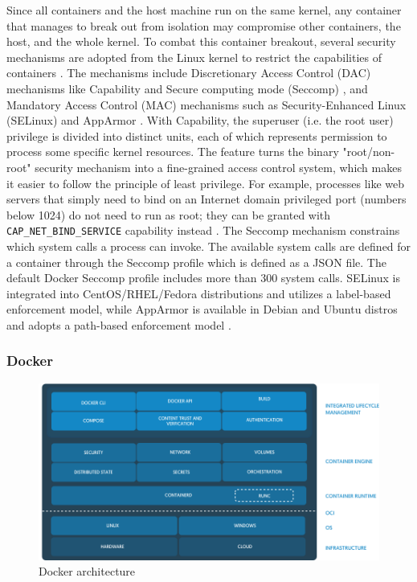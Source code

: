 \documentclass[english, 12pt, a4paper, sci, utf8, a-2b, online]{aaltothesis}
\begin{document}
Since all containers and the host machine run on the same kernel, any container that manages to break out from isolation may compromise other containers, the host, and the whole kernel.
To combat this container breakout, several security mechanisms are adopted from the Linux kernel to restrict the capabilities of containers \cite{lin2018measurement}.
The mechanisms include Discretionary Access Control (DAC) mechanisms like Capability \cite{manpages-capabilities} and Secure computing mode (Seccomp) \cite{manpages-seccomp}, and Mandatory Access Control (MAC) mechanisms such as Security-Enhanced Linux (SELinux) and AppArmor \cite{apparmor}.
With Capability, the superuser (i.e. the root user) privilege is divided into distinct units, each of which represents permission to process some specific kernel resources.
The feature turns the binary "root/non-root" security mechanism into a fine-grained access control system, which makes it easier to follow the principle of least privilege.
For example, processes like web servers that simply need to bind on an Internet domain privileged port (numbers below 1024) do not need to run as root; they can be granted with \lstinline{CAP_NET_BIND_SERVICE} capability instead \cite{docker-security}.
The Seccomp mechanism constrains which system calls a process can invoke.
The available system calls are defined for a container through the Seccomp profile which is defined as a JSON file.
The default Docker Seccomp profile \cite{docker-default-seccomp} includes more than 300 system calls.
SELinux is integrated into CentOS/RHEL/Fedora distributions and utilizes a label-based enforcement model, while AppArmor is available in Debian and Ubuntu distros and adopts a path-based enforcement model \cite{lin2018measurement}.

\subsubsection{Docker}

\begin{figure}[h!]
  \centering
  \includegraphics[width=\linewidth]{files/docker-arch.jpeg}
  \caption{Docker architecture \cite{containerd}}
  \label{figure-docker}
\end{figure}
\end{document}
